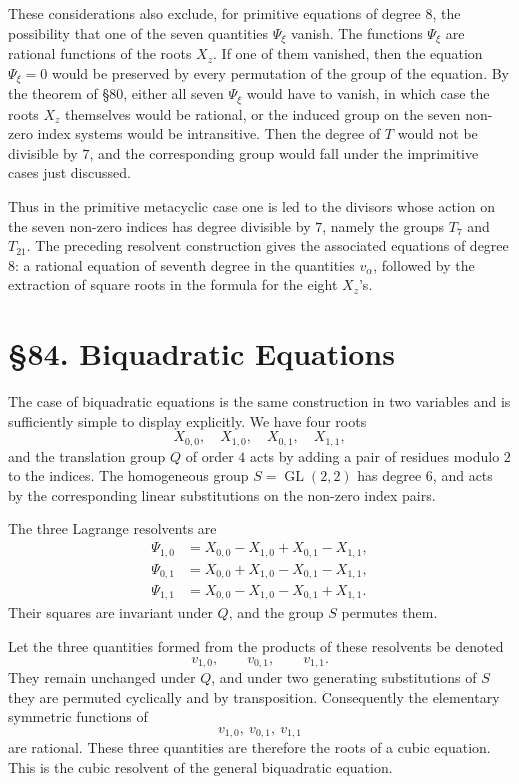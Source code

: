 \documentclass[11pt,a4paper]{book}
\newcommand{\webersection}[2]{\clearpage\section*{\S #1. #2}}
\DeclareMathOperator{\GL}{GL}
\begin{document}
These considerations also exclude, for primitive equations of degree \(8\), the possibility that one of the seven quantities \(\Psi_\xi\) vanish.  The functions \(\Psi_\xi\) are rational functions of the roots \(X_z\).  If one of them vanished, then the equation \(\Psi_\xi=0\) would be preserved by every permutation of the group of the equation.  By the theorem of \S 80, either all seven \(\Psi_\xi\) would have to vanish, in which case the roots \(X_z\) themselves would be rational, or the induced group on the seven non-zero index systems would be intransitive.  Then the degree of \(T\) would not be divisible by \(7\), and the corresponding group would fall under the imprimitive cases just discussed.

Thus in the primitive metacyclic case one is led to the divisors whose action on the seven non-zero indices has degree divisible by \(7\), namely the groups \(T_7\) and \(T_{21}\).  The preceding resolvent construction gives the associated equations of degree \(8\): a rational equation of seventh degree in the quantities \(v_\alpha\), followed by the extraction of square roots in the formula for the eight \(X_z\)'s.

\webersection{84}{Biquadratic Equations}

The case of biquadratic equations is the same construction in two variables and is sufficiently simple to display explicitly.  We have four roots
\[
 X_{0,0},\quad X_{1,0},\quad X_{0,1},\quad X_{1,1},
\]
and the translation group \(Q\) of order \(4\) acts by adding a pair of residues modulo \(2\) to the indices.  The homogeneous group \(S=\GL(2,2)\) has degree \(6\), and acts by the corresponding linear substitutions on the non-zero index pairs.

The three Lagrange resolvents are
\[
\begin{aligned}
 \Psi_{1,0}&=X_{0,0}-X_{1,0}+X_{0,1}-X_{1,1},\\
 \Psi_{0,1}&=X_{0,0}+X_{1,0}-X_{0,1}-X_{1,1},\\
 \Psi_{1,1}&=X_{0,0}-X_{1,0}-X_{0,1}+X_{1,1}.
\end{aligned}
\]
Their squares are invariant under \(Q\), and the group \(S\) permutes them.

Let the three quantities formed from the products of these resolvents be denoted
\[
 v_{1,0},\qquad v_{0,1},\qquad v_{1,1}.
\]
They remain unchanged under \(Q\), and under two generating substitutions of \(S\) they are permuted cyclically and by transposition.  Consequently the elementary symmetric functions of
\[
 v_{1,0},\ v_{0,1},\ v_{1,1}
\]
are rational.  These three quantities are therefore the roots of a cubic equation.  This is the cubic resolvent of the general biquadratic equation.
\end{document}
